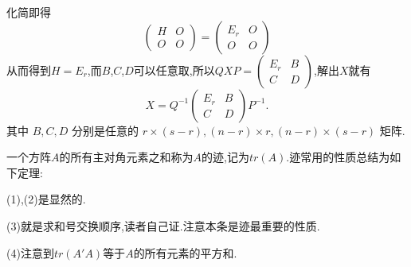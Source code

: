 \documentclass{article}
\begin{document}
化简即得
\begin{equation*}
    \left(\begin{array}{ll}
        H & O \\
        O & O
    \end{array}\right)=\left(\begin{array}{cc}
        E_{r} & O \\
        O     & O
    \end{array}\right)
\end{equation*}
从而得到$H = E_r$,而$B$,$C$,$D$可以任意取,所以$Q X P = \left(
    \begin{array}{cc}
            E_r & B \\
            C   & D
        \end{array}
    \right)$,解出$X$就有
\begin{equation*}
    X=Q^{-1}\left(\begin{array}{cc}
            E_{r} & B \\
            C     & D
        \end{array}\right) P^{-1}.
\end{equation*}
其中 $B, C, D$ 分别是任意的 $r \times(s-r),(n-r) \times r,(n-r) \times(s-r)$ 矩阵.

\vspace{1ex}

\vspace{2ex}
\vspace{2ex}

一个方阵$A$的所有主对角元素之和称为$A$的迹,记为$t r \left(A\right)$.迹常用的性质总结为如下定理:


 (1),(2)是显然的.

(3)就是求和号交换顺序,读者自己证.注意本条是迹最重要的性质.

(4)注意到$tr \left(A'A\right)$等于$A$的所有元素的平方和.

\vspace{1ex}
 
\end{document}
